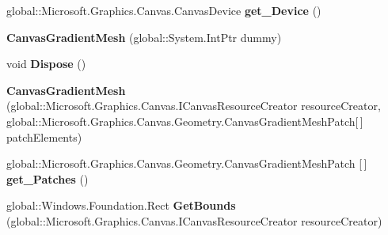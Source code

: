 \begin{DoxyCompactItemize}
\item 
\mbox{\label{class_microsoft_1_1_graphics_1_1_canvas_1_1_geometry_1_1_canvas_gradient_mesh_aa06489c123c9a773e0a00e8dacd96bfd}} 
global\+::\+Microsoft.\+Graphics.\+Canvas.\+Canvas\+Device {\bfseries get\+\_\+\+Device} ()
\item 
\mbox{\label{class_microsoft_1_1_graphics_1_1_canvas_1_1_geometry_1_1_canvas_gradient_mesh_a7284f7e93f2c21e5bad79e6bbae86e49}} 
{\bfseries Canvas\+Gradient\+Mesh} (global\+::\+System.\+Int\+Ptr dummy)
\item 
\mbox{\label{class_microsoft_1_1_graphics_1_1_canvas_1_1_geometry_1_1_canvas_gradient_mesh_aff29d3a0c6889d589409c3bd3402cb7c}} 
void {\bfseries Dispose} ()
\item 
\mbox{\label{class_microsoft_1_1_graphics_1_1_canvas_1_1_geometry_1_1_canvas_gradient_mesh_a6677d365775f86d865af80a34d58b31d}} 
{\bfseries Canvas\+Gradient\+Mesh} (global\+::\+Microsoft.\+Graphics.\+Canvas.\+I\+Canvas\+Resource\+Creator resource\+Creator, global\+::\+Microsoft.\+Graphics.\+Canvas.\+Geometry.\+Canvas\+Gradient\+Mesh\+Patch\mbox{[}$\,$\mbox{]} patch\+Elements)
\item 
\mbox{\label{class_microsoft_1_1_graphics_1_1_canvas_1_1_geometry_1_1_canvas_gradient_mesh_ad14c223648421f65d2cbd4de1c1b0877}} 
global\+::\+Microsoft.\+Graphics.\+Canvas.\+Geometry.\+Canvas\+Gradient\+Mesh\+Patch \mbox{[}$\,$\mbox{]} {\bfseries get\+\_\+\+Patches} ()
\item 
\mbox{\label{class_microsoft_1_1_graphics_1_1_canvas_1_1_geometry_1_1_canvas_gradient_mesh_a3239426176127d3d80193f667dcd34f8}} 
global\+::\+Windows.\+Foundation.\+Rect {\bfseries Get\+Bounds} (global\+::\+Microsoft.\+Graphics.\+Canvas.\+I\+Canvas\+Resource\+Creator resource\+Creator)
\item 
\mbox{\label{class_microsoft_1_1_graphics_1_1_canvas_1_1_geometry_1_1_canvas_gradient_mesh_a446144d0cc83e13b8dab0cb1b480a549}} 

\end{DoxyCompactItemize}
